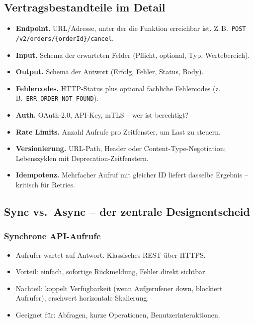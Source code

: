 \documentclass[11pt,a4paper,oneside]{article}
\newcommand{\fachbegriff}[1]{\textbf{#1}}
\begin{document}
\subsection{Vertragsbestandteile im Detail}

\begin{itemize}
  \item \fachbegriff{Endpoint.} URL/Adresse, unter der die Funktion erreichbar ist. Z.\,B.\ \texttt{POST /v2/orders/\{orderId\}/cancel}.
  \item \fachbegriff{Input.} Schema der erwarteten Felder (Pflicht, optional, Typ, Wertebereich).
  \item \fachbegriff{Output.} Schema der Antwort (Erfolg, Fehler, Status, Body).
  \item \fachbegriff{Fehlercodes.} HTTP-Status plus optional fachliche Fehlercodes (z.\,B.\ \texttt{ERR\_ORDER\_NOT\_FOUND}).
  \item \fachbegriff{Auth.} OAuth-2.0, API-Key, mTLS -- wer ist berechtigt?
  \item \fachbegriff{Rate Limits.} Anzahl Aufrufe pro Zeitfenster, um Last zu steuern.
  \item \fachbegriff{Versionierung.} URL-Path, Header oder Content-Type-Negotiation; Lebenszyklen mit Deprecation-Zeitfenstern.
  \item \fachbegriff{Idempotenz.} Mehrfacher Aufruf mit gleicher ID liefert dasselbe Ergebnis -- kritisch für Retries.
\end{itemize}

\subsection{Sync vs.\ Async -- der zentrale Designentscheid}

\subsubsection{Synchrone API-Aufrufe}

\begin{itemize}
  \item Aufrufer wartet auf Antwort. Klassisches REST über HTTPS.
  \item Vorteil: einfach, sofortige Rückmeldung, Fehler direkt sichtbar.
  \item Nachteil: koppelt Verfügbarkeit (wenn Aufgerufener down, blockiert Aufrufer), erschwert horizontale Skalierung.
  \item Geeignet für: Abfragen, kurze Operationen, Benutzerinteraktionen.
\end{itemize}
\end{document}

